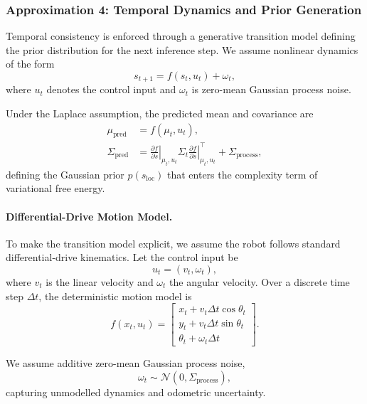 \documentclass[a4paper, twoside]{article}
\begin{document}
\subsubsection{Approximation 4: Temporal Dynamics and Prior Generation}
\label{sec:room-dynamics}

Temporal consistency is enforced through a generative transition model defining
the prior distribution for the next inference step. We assume nonlinear dynamics
of the form
\begin{equation}
s_{t+1} = f(s_t, u_t) + \omega_t,
\end{equation}
where $u_t$ denotes the control input and $\omega_t$ is zero-mean Gaussian process
noise.

Under the Laplace assumption, the predicted mean and covariance are
\begin{align}
\mu_{\text{pred}} &= f(\mu_t, u_t), \\
\Sigma_{\text{pred}} &=
\left.
\frac{\partial f}{\partial s}
\right|_{\mu_t,u_t}
\Sigma_t
\left.
\frac{\partial f}{\partial s}
\right|_{\mu_t,u_t}^{\!\top}
+
\Sigma_{\text{process}},
\end{align}
defining the Gaussian prior $p(s_{\text{loc}})$ that enters the complexity term
of variational free energy.

\paragraph{Differential-Drive Motion Model.}
To make the transition model explicit, we assume the robot follows standard
differential-drive kinematics. Let the control input be
\begin{equation}
u_t = (v_t, \omega_t),
\end{equation}
where $v_t$ is the linear velocity and $\omega_t$ the angular velocity. Over a
discrete time step $\Delta t$, the deterministic motion model is
\begin{equation}
f(x_t, u_t) =
\begin{bmatrix}
x_t + v_t \Delta t \cos \theta_t \\
y_t + v_t \Delta t \sin \theta_t \\
\theta_t + \omega_t \Delta t
\end{bmatrix}.
\label{eq:diffdrive}
\end{equation}

We assume additive zero-mean Gaussian process noise,
\begin{equation}
\omega_t \sim \mathcal{N}(0, \Sigma_{\text{process}}),
\end{equation}
capturing unmodelled dynamics and odometric uncertainty.
\end{document}
